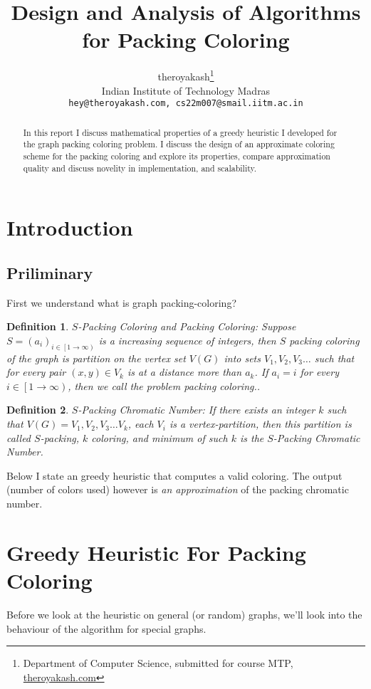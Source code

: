 \documentclass{article}
\title{Design and Analysis of Algorithms for Packing Coloring}
\author{
    theroyakash\thanks{\textsf{Department of Computer Science, submitted for course} \textsf{MTP}, \href{https://theroyakash.com}{\textsf{theroyakash.com}}}\\
    Indian Institute of Technology Madras \\
    \texttt{hey@theroyakash.com, cs22m007@smail.iitm.ac.in}
}
\newtheorem{define}{Definition}[section]
\theoremstyle{remark}
\begin{document}
\maketitle

\begin{abstract}
    In this report I discuss mathematical properties of a
    greedy heuristic I developed for the graph packing coloring problem.
    I discuss the design of an approximate coloring scheme for the packing coloring
    and explore its properties, compare approximation quality 
    and discuss novelity in implementation, and scalability.
\end{abstract}

\section{Introduction}
\subsection{Priliminary}
First we understand what is graph packing-coloring?

\begin{define}{\textsf{$S$-Packing Coloring and Packing Coloring}:}
    \textit{Suppose $S = (a_i)_{i \in \left[1 \to \infty\right)}$ is a increasing sequence of integers,
    then $S$ packing coloring of the graph is partition on the vertex set
    $V(G)$ into sets $V_1, V_2, V_3 \dots$ such that for every pair $(x, y) \in V_k$
    is at a distance more than $a_k$. If $a_i = i$ for every 
    $i \in \left[1 \to \infty\right)$, then we call the problem packing coloring.}.
\end{define}

\vspace{1mm}

\begin{define}{\textsf{$S$-Packing Chromatic Number}:}
    \textit{If there exists an integer $k$ such that $V(G) = V_1, V_2, V_3 \dots V_k$,
    each $V_i$ is a vertex-partition, then this partition is called
    $S$-packing, $k$ coloring, and minimum of such $k$ is the $S$-Packing Chromatic Number.}
\end{define}

Below I state an greedy heuristic that computes a valid coloring. 
The output (number of colors used)
however is \textit{an approximation} of the packing chromatic number.

\section{Greedy Heuristic For Packing Coloring}
Before we look at the heuristic on general (or random) graphs,
we'll look into the behaviour of the algorithm for special graphs.
\end{document}
